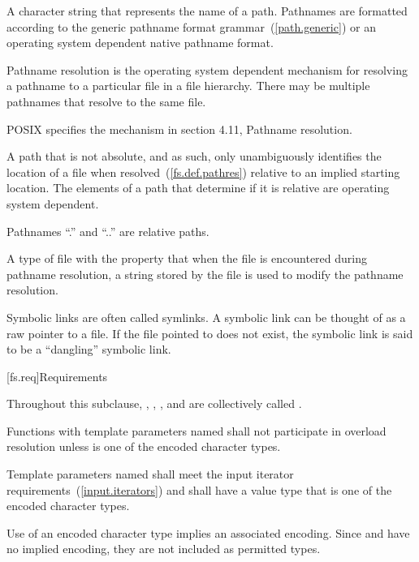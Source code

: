 A character string that represents the name of a path. Pathnames are
formatted according to the generic pathname format grammar~(\ref{path.generic}) or an
operating system dependent
native pathname format.

Pathname resolution is the operating system dependent mechanism for resolving
a pathname to a particular file in a file hierarchy. There may be multiple
pathnames that resolve to the same file.
\begin{example} POSIX specifies the mechanism in section 4.11, Pathname resolution.
\end{example}

A path that is not absolute, and as such, only unambiguously
identifies the location of a file when resolved~(\ref{fs.def.pathres}) relative to
an implied starting location. The elements of a path that determine if it is
relative are operating system dependent.
\begin{note}
Pathnames ``.'' and ``..'' are relative paths.
\end{note}

A type of file with the
property that when the file is encountered during pathname resolution, a string
stored by the file is used to modify the pathname resolution.
\begin{note} Symbolic links are often called symlinks. A symbolic link can be thought of as a raw pointer to a file.
If the file pointed to does not exist, the symbolic link is said to be a
``dangling'' symbolic link.\end{note}

[fs.req]{Requirements}

\pnum
Throughout this subclause, , ,
, and  are collectively called
.

\pnum
Functions with template parameters named 
shall not participate in overload resolution
unless  is one of the encoded character types.

\pnum
Template parameters named  shall meet the
input iterator requirements~(\ref{input.iterators}) and shall
have a value type that is one of the encoded character types.

\pnum
\begin{note} Use of an encoded character type implies an associated
encoding. Since  and  have no
implied encoding, they are not included as permitted types. \end{note}


